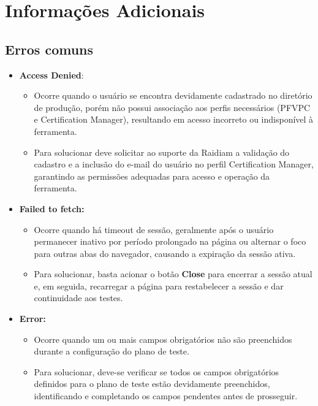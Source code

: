 \chapter{Informações Adicionais}

\section{Erros comuns}
\begin{itemize}
    \item \textbf{Access Denied}:
    \begin{figure}[H]
    \centering
    \label{fig:acessdenied}
    \end{figure}
    \begin{itemize}
        \item Ocorre quando o usuário se encontra devidamente cadastrado no diretório de produção, porém não possui associação aos perfis necessários (PFVPC e Certification Manager), resultando em acesso incorreto ou indisponível à ferramenta.
        \item Para solucionar deve solicitar ao suporte da Raidiam a validação do cadastro e a inclusão do e-mail do usuário no perfil Certification Manager, garantindo as permissões adequadas para acesso e operação da ferramenta.

    \end{itemize}
        \item \textbf{Failed to fetch:}
    \begin{figure}[H]
        \centering
        \label{fig:failedtofetch}
    \end{figure}
    \begin{itemize}
        \item Ocorre quando há timeout de sessão, geralmente após o usuário permanecer inativo por período prolongado na página ou alternar o foco para outras abas do navegador, causando a expiração da sessão ativa.
        \item Para solucionar, basta acionar o botão \textbf{Close} para encerrar a sessão atual e, em seguida, recarregar a página para restabelecer a sessão e dar continuidade aos testes.
    \end{itemize}

    \item \textbf{Error:}
    \begin{figure}[H]
        \centering
        \label{fig:error}
    \end{figure}
    \begin{itemize}
        \item Ocorre quando um ou mais campos obrigatórios não são preenchidos durante a configuração do plano de teste.
        \item Para solucionar, deve-se verificar se todos os campos obrigatórios definidos para o plano de teste estão devidamente preenchidos, identificando e completando os campos pendentes antes de prosseguir.
    \end{itemize}


\end{itemize}
